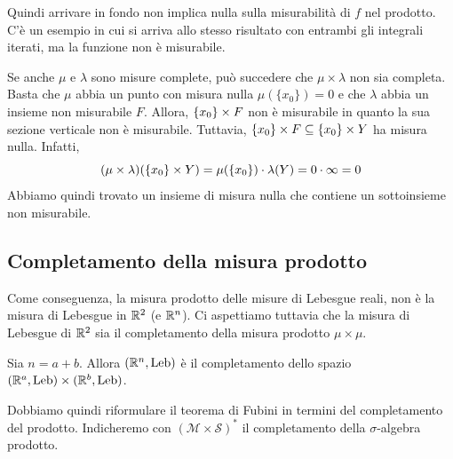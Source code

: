\documentclass[a4paper]{article}
\begin{document}
\begin{radioactive}
Quindi arrivare in fondo non implica nulla sulla misurabilità di \(f\)
nel prodotto.
C'è un esempio in cui si arriva allo stesso risultato con entrambi gli integrali iterati,
ma la funzione non è misurabile.
\end{radioactive}

\begin{radioactive}
Se anche \(\mu\) e \(\lambda\) sono misure complete, può succedere che
\(\mu \times \lambda\) non sia completa.
Basta che \(\mu\) abbia un punto con misura nulla \(\mu(\{x_0\}) = 0\)
e che \(\lambda\) abbia un insieme non misurabile \(F\).
Allora, \(\{x_0\} \times F\) non è misurabile
in quanto la sua sezione verticale non è misurabile.
Tuttavia, \(\{x_0\} \times F \subseteq \{x_0\} \times Y\)
ha misura nulla. Infatti, \[
    (\mu \times \lambda)(\{x_0\} \times Y)
    = \mu(\{x_0\}) \cdot \lambda(Y) = 0 \cdot \infty = 0
\]
Abbiamo quindi trovato un insieme di misura nulla che contiene un sottoinsieme non misurabile.
\end{radioactive}

\subsection{Completamento della misura prodotto}

\begin{radioactive}
Come conseguenza, la misura prodotto delle misure di Lebesgue reali,
non è la misura di Lebesgue in \(\mathbb{R}^2\) (e \(\mathbb{R}^n\)).
Ci aspettiamo tuttavia che la misura di Lebesgue di \(\mathbb{R}^2\)
sia il completamento della misura prodotto \(\mu\times\mu\).
\end{radioactive}

\begin{radioactive}
\begin{snippettheorem}{}
    Sia \(n = a+b\). Allora \((\mathbb{R}^n, \text{Leb})\) è il completamento dello spazio
    \((\mathbb{R}^a, \text{Leb}) \times (\mathbb{R}^b, \text{Leb})\).
\end{snippettheorem}
\end{radioactive}

\begin{radioactive}
Dobbiamo quindi riformulare il teorema di Fubini in termini del completamento del prodotto.
Indicheremo con \((\mathcal M \times \mathcal S)^\ast\) il completamento della \(\sigma\)-algebra
prodotto.
\end{radioactive}
\end{document}

